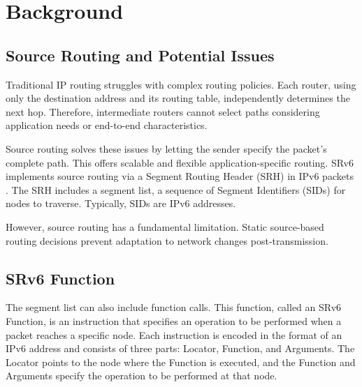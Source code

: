 \documentclass[conference]{IEEEtran}
\begin{document}
\section{Background}

\subsection{Source Routing and Potential Issues}

Traditional IP routing struggles with complex routing policies.
Each router, using only the destination address and its routing table, independently determines the next hop.
Therefore, intermediate routers cannot select paths considering application needs or end-to-end characteristics.

Source routing solves these issues by letting the sender specify the packet's complete path.
This offers scalable and flexible application-specific routing.
SRv6 implements source routing via a Segment Routing Header (SRH) in IPv6 packets \cite{rfc8754}\cite{rfc9256}.
The SRH includes a segment list, a sequence of Segment Identifiers (SIDs) for nodes to traverse.
Typically, SIDs are IPv6 addresses.

However, source routing has a fundamental limitation.
Static source-based routing decisions prevent adaptation to network changes post-transmission.

\subsection{SRv6 Function}

The segment list can also include function calls.
This function, called an SRv6 Function, is an instruction that specifies an operation to be performed when a packet reaches a specific node.
Each instruction is encoded in the format of an IPv6 address and consists of three parts: Locator, Function, and Arguments.
The Locator points to the node where the Function is executed, and the Function and Arguments specify the operation to be performed at that node.


\end{document}
